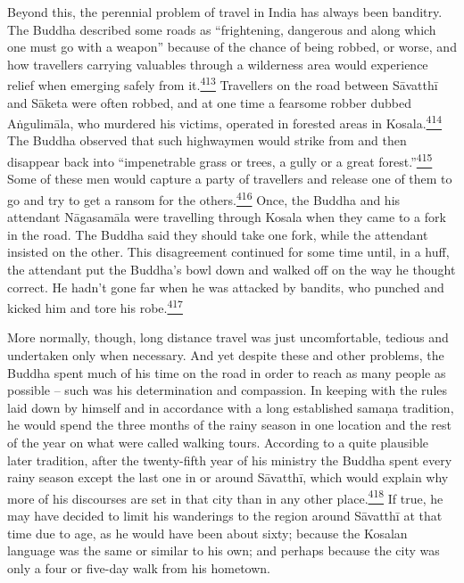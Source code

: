 Beyond this, the perennial problem of travel in India has always been
banditry. The Buddha described some roads as ``frightening, dangerous
and along which one must go with a weapon'' because of the chance of
being robbed, or worse, and how travellers carrying valuables through a
wilderness area would experience relief when emerging safely from
it.\label{footprints_split_012.html_fnref413}\hyperref[footprints_split_025.htmlux5cux23fn413]{\textsuperscript{413}}
Travellers on the road between Sāvatthī and Sāketa were often robbed,
and at one time a fearsome robber dubbed Aṅgulimāla, who murdered his
victims, operated in forested areas in
Kosala.\label{footprints_split_012.html_fnref414}\hyperref[footprints_split_025.htmlux5cux23fn414]{\textsuperscript{414}}
The Buddha observed that such highwaymen would strike from and then
disappear back into ``impenetrable grass or trees, a gully or a great
forest.''\label{footprints_split_012.html_fnref415}\hyperref[footprints_split_025.htmlux5cux23fn415]{\textsuperscript{415}}
Some of these men would capture a party of travellers and release one of
them to go and try to get a ransom for the
others.\label{footprints_split_012.html_fnref416}\hyperref[footprints_split_025.htmlux5cux23fn416]{\textsuperscript{416}}
Once, the Buddha and his attendant Nāgasamāla were travelling through
Kosala when they came to a fork in the road. The Buddha said they should
take one fork, while the attendant insisted on the other. This
disagreement continued for some time until, in a huff, the attendant put
the Buddha's bowl down and walked off on the way he thought correct. He
hadn't gone far when he was attacked by bandits, who punched and kicked
him and tore his
robe.\label{footprints_split_012.html_fnref417}\hyperref[footprints_split_025.htmlux5cux23fn417]{\textsuperscript{417}}

More normally, though, long distance travel was just uncomfortable,
tedious and undertaken only when necessary. And yet despite these and
other problems, the Buddha spent much of his time on the road in order
to reach as many people as possible -- such was his determination and
compassion. In keeping with the rules laid down by himself and in
accordance with a long established samaṇa tradition, he would spend the
three months of the rainy season in one location and the rest of the
year on what were called walking tours. According to a quite plausible
later tradition, after the twenty-fifth year of his ministry the Buddha
spent every rainy season except the last one in or around Sāvatthī,
which would explain why more of his discourses are set in that city than
in any other
place.\label{footprints_split_012.html_fnref418}\hyperref[footprints_split_025.htmlux5cux23fn418]{\textsuperscript{418}}
If true, he may have decided to limit his wanderings to the region
around Sāvatthī at that time due to age, as he would have been about
sixty; because the Kosalan language was the same or similar to his own;
and perhaps because the city was only a four or five-day walk from his
hometown.

